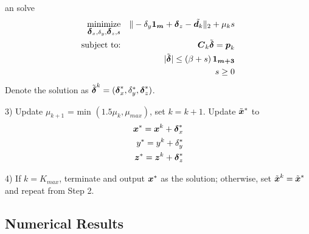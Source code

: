 \noindent
an solve
\setcounter{abc}{0}
\begin{eqnarray} 
\nonumber
\mathop{\mbox{minimize}}_{\mbox{\boldmath${\delta}$}_x, \delta_y, \mbox{\boldmath${\delta}$}_z, s}& &\| -\delta_y\mbox{\boldmath${1_m}$} + \mbox{\boldmath${\delta}$}_z - \tilde{\mbox{\boldmath$d$}_k} \|_2 + \mu_ks
\\ 
\nonumber
\mbox{subject to:}& &\mbox{\boldmath$C$}_k\tilde{\mbox{\boldmath${\delta}$}}  = \mbox{\boldmath$p$}_k 
\\
\nonumber
 & &|\tilde{\mbox{\boldmath${\delta}$}}|  \leq \left(\beta + s\right)\mbox{\boldmath${1_{m+3}}$} 
 \\
\nonumber
& & s \geq 0
\end{eqnarray}
\noindent
Denote the solution as $\tilde{\mbox{\boldmath${\delta}$}}^k = (\mbox{\boldmath${\delta}$}_x^*, \delta_y^*, \mbox{\boldmath${\delta}$}_z^*)$. 



3) Update  $\mu_{k+1} $ = min $(1.5\mu_k, \mu_{max})$, set $k = k+1$. Update $\tilde{\mbox{\boldmath$x$}}^{*}$ to
\setcounter{abc}{0}
\begin{eqnarray} 
\nonumber
\mbox{\boldmath$x$}^{*} = \mbox{\boldmath$x$}^k + \mbox{\boldmath${\delta}$}_x^* \\
\nonumber
y^{*} = y^k + \delta_y^* \\
\nonumber
\mbox{\boldmath$z$}^{*} = \mbox{\boldmath$z$}^k + \mbox{\boldmath${\delta}$}_z^*
\end{eqnarray}



4) If $k = K_{max}$, terminate and output $\mbox{\boldmath$x$}^*$ as the solution; otherwise, set $\tilde{\mbox{\boldmath$x$}}^{k} = \tilde{\mbox{\boldmath$x$}}^{*}$  and repeat from Step 2. 



\subsection{Numerical Results}

